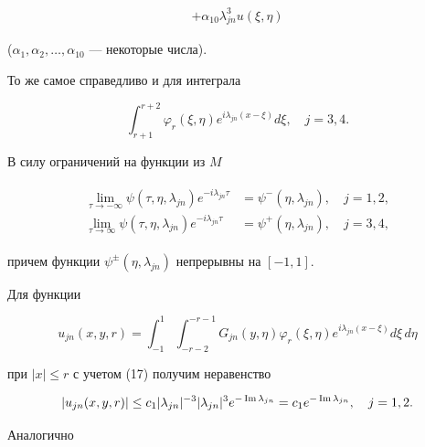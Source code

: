 \begin{pf}
\begin{gather*}
+\alpha_{10}\lambda^3_{jn}u(\xi,\eta) 


\end{gather*} 


($\alpha_1,\alpha_2,\dotsc,\alpha_{10}$ --- некоторые числа). 


 


То же самое справедливо и для интеграла 


$$ 


\int^{r+2}_{r+1}\varphi_r(\xi,\eta)e^{i\lambda_{jn}(x-\xi)}d\xi, 


\quad j=3,4. 


$$ 


В силу ограничений на функции из $M$ 


\begin{align} 


\begin{split} 


\lim_{\tau\to -\infty}\psi(\tau,\eta,\lambda_{jn})


e^{-i\lambda_{jn}\tau} & =\psi^-(\eta,\lambda_{jn}),\quad j=1,2,\\ 


\lim_{\tau\to \infty}\psi(\tau,\eta,\lambda_{jn})


e^{-i\lambda_{jn}\tau} & =\psi^+(\eta,\lambda_{jn}),\quad j=3,4,


\end{split} 


\end{align} 


причем функции $\psi^\pm(\eta,\lambda_{jn})$ непрерывны на $[-1,1]$. 


 


Для функции 


$$ 


u_{jn}(x,y,r)=\int^1_{-1}\int^{-r-1}_{-r-2}G_{jn}(y,\eta) 


\varphi_r(\xi,\eta)e^{i\lambda_{jn}(x-\xi)}d\xi\,d\eta 


$$ 


при $|x|\le r$ с учетом (17) получим неравенство 


$$ 


|u_{jn}(x,y,r)|\le c_1|\lambda_{jn}|^{-3}|\lambda_{jn}|^3 


e^{-\im \lambda_{jn}}=c_1e^{-\im \lambda_{jn}},\quad j=1,2. 


$$ 


Аналогично 


$$ 



\end{pf}
